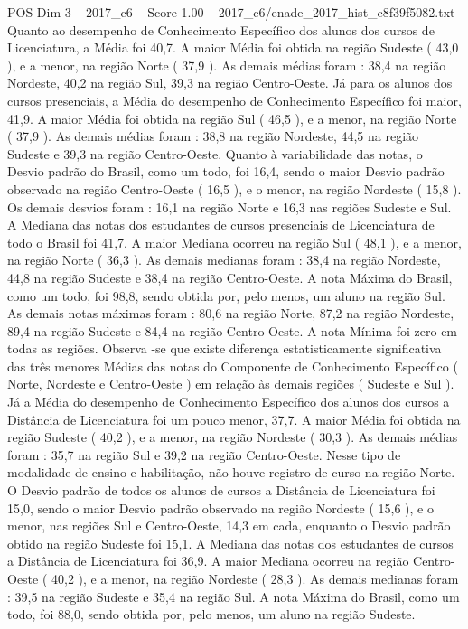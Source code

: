 \begin{textsample}{POS Dim 3 – 2017\_c6 – Score 1.00 – 2017\_c6/enade\_2017\_hist\_c8f39f5082.txt}
Quanto ao desempenho de Conhecimento Específico dos alunos dos cursos de Licenciatura, a Média foi 40,7.
A maior Média foi obtida na região Sudeste ( 43,0 ), e a menor, na região Norte ( 37,9 ).
As demais médias foram : 38,4 na região Nordeste, 40,2 na região Sul, 39,3 na região Centro-Oeste.
Já para os alunos dos cursos presenciais, a Média do desempenho de Conhecimento Específico foi maior, 41,9.
A maior Média foi obtida na região Sul ( 46,5 ), e a menor, na região Norte ( 37,9 ).
As demais médias foram : 38,8 na região Nordeste, 44,5 na região Sudeste e 39,3 na região Centro-Oeste.
Quanto à variabilidade das notas, o Desvio padrão do Brasil, como um todo, foi 16,4, sendo o maior Desvio padrão observado na região Centro-Oeste ( 16,5 ), e o menor, na região Nordeste ( 15,8 ).
Os demais desvios foram : 16,1 na região Norte e 16,3 nas regiões Sudeste e Sul.
A Mediana das notas dos estudantes de cursos presenciais de Licenciatura de todo o Brasil foi 41,7.
A maior Mediana ocorreu na região Sul ( 48,1 ), e a menor, na região Norte ( 36,3 ).
As demais medianas foram : 38,4 na região Nordeste, 44,8 na região Sudeste e 38,4 na região Centro-Oeste.
A nota Máxima do Brasil, como um todo, foi 98,8, sendo obtida por, pelo menos, um aluno na região Sul.
As demais notas máximas foram : 80,6 na região Norte, 87,2 na região Nordeste, 89,4 na região Sudeste e 84,4 na região Centro-Oeste.
A nota Mínima foi zero em todas as regiões.
Observa -se que existe diferença estatisticamente significativa das três menores Médias das notas do Componente de Conhecimento Específico ( Norte, Nordeste e Centro-Oeste ) em relação às demais regiões ( Sudeste e Sul ).
Já a Média do desempenho de Conhecimento Específico dos alunos dos cursos a Distância de Licenciatura foi um pouco menor, 37,7.
A maior Média foi obtida na região Sudeste ( 40,2 ), e a menor, na região Nordeste ( 30,3 ).
As demais médias foram : 35,7 na região Sul e 39,2 na região Centro-Oeste.
Nesse tipo de modalidade de ensino e habilitação, não houve registro de curso na região Norte.
O Desvio padrão de todos os alunos de cursos a Distância de Licenciatura foi 15,0, sendo o maior Desvio padrão observado na região Nordeste ( 15,6 ), e o menor, nas regiões Sul e Centro-Oeste, 14,3 em cada, enquanto o Desvio padrão obtido na região Sudeste foi 15,1.
A Mediana das notas dos estudantes de cursos a Distância de Licenciatura foi 36,9.
A maior Mediana ocorreu na região Centro-Oeste ( 40,2 ), e a menor, na região Nordeste ( 28,3 ).
As demais medianas foram : 39,5 na região Sudeste e 35,4 na região Sul.
A nota Máxima do Brasil, como um todo, foi 88,0, sendo obtida por, pelo menos, um aluno na região Sudeste.

\end{textsample}

